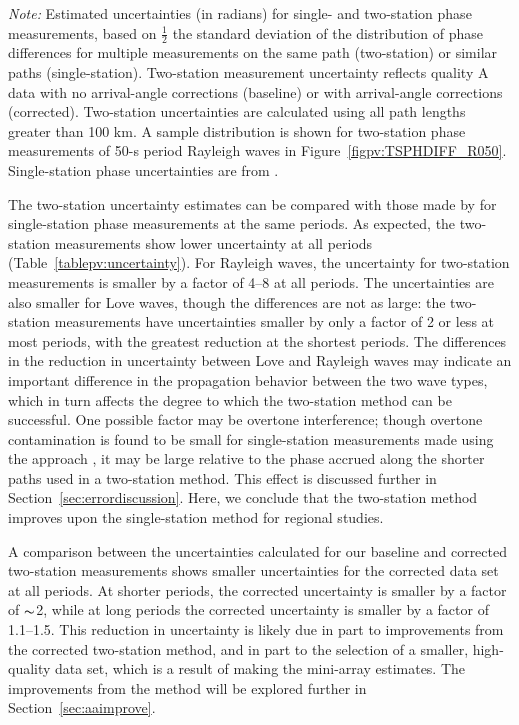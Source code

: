 \documentclass[12pt,oneside]{book}
\begin{document}
\begin{table}
\begin{center}
\end{center}
\medskip
\textit{Note:} Estimated uncertainties (in radians) for single- and two-station phase measurements, based on $\frac{1}{2}$ the standard deviation of the distribution of phase differences for multiple measurements on the same path (two-station) or similar paths (single-station). Two-station measurement uncertainty reflects quality A data with no arrival-angle corrections (baseline) or with arrival-angle corrections (corrected). Two-station uncertainties are calculated using all path lengths greater than 100 km. A sample distribution is shown for two-station phase measurements of 50-s period Rayleigh waves in Figure~\ref{figpv:TSPHDIFF_R050}. Single-station phase uncertainties are from \citet{Ekstrom2011}. 

\end{table}
%

The two-station uncertainty estimates can be compared with those made by \citet{Ekstrom2011} for single-station phase measurements at the same periods. As expected, the two-station measurements show lower uncertainty at all periods (Table~\ref{tablepv:uncertainty}). For Rayleigh waves, the uncertainty for two-station measurements is smaller by a factor of 4\nobreakdash--8 at all periods. The uncertainties are also smaller for Love waves, though the differences are not as large: the two-station measurements have uncertainties smaller by only a factor of 2 or less at most periods, with the greatest reduction at the shortest periods. The differences in the reduction in uncertainty between Love and Rayleigh waves may indicate an important difference in the propagation behavior between the two wave types, which in turn affects the degree to which the two-station method can be successful. One possible factor may be overtone interference; though overtone contamination is found to be small for single-station measurements made using the \citet{Ekstrom1997} approach \citep{Nettles2011}, it may be large relative to the phase accrued along the shorter paths used in a two-station method. This effect is discussed further in Section~\ref{sec:errordiscussion}. Here, we conclude that the two-station method improves upon the single-station method for regional studies. 

A comparison between the uncertainties calculated for our baseline and corrected two-station measurements shows smaller uncertainties for the corrected data set at all periods. At shorter periods, the corrected uncertainty is smaller by a factor of $\thicksim$2, while at long periods the corrected uncertainty is smaller by a factor of 1.1--1.5. This reduction in uncertainty is likely due in part to improvements from the corrected two-station method, and in part to the selection of a smaller, high-quality data set, which is a result of making the mini-array estimates. The improvements from the method will be explored further in Section~\ref{sec:aaimprove}. 
\end{document}
